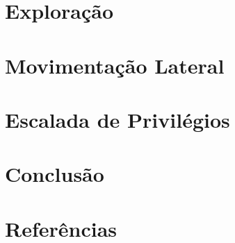\documentclass[12pt]{article}
\begin{document}
\section{Exploração}


\section{Movimentação Lateral}


\section{Escalada de Privilégios}

\section{Conclusão}

\section{Referências}

\begin{itemize}
    
\end{itemize}
\end{document}
